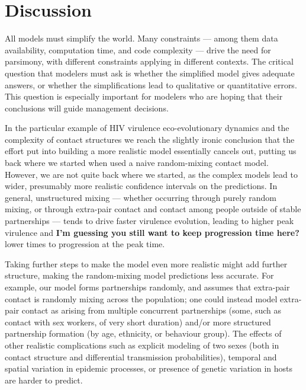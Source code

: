 \documentclass[10pt,letterpaper]{article}
\newcommand{\etal}{\textit{et al.}}
\newcommand{\todo}[1]{\color{red} \textbf{#1}}
\begin{document}
\section*{Discussion}

All models must simplify the world.  Many constraints --- among them data
availability, computation time, and code complexity --- drive the need
for parsimony, with different constraints applying in different
contexts. The critical question that modelers must ask is whether the
simplified model gives adequate answers, or whether the
simplifications lead to qualitative or quantitative errors.
This question is especially important for modelers who
are hoping that their conclusions will guide management decisions.

In the particular example of HIV virulence eco-evolutionary dynamics
and the complexity of contact structures
we reach the slightly ironic conclusion that the
effort put into building a more realistic model essentially cancels
out, putting us back where we started when used a naive random-mixing
contact model.
However, we are not quite back where we started, as the
complex models lead to wider, presumably more realistic
confidence intervals on the predictions.
In general, unstructured mixing --- whether occurring through 
purely random mixing, or through extra-pair contact and contact
among people outside of stable partnerships --- tends to drive
faster virulence evolution, leading to higher peak virulence and \todo{I'm guessing you still want to keep progression time here?}
lower times to progression at the peak time.

Taking further steps to make the model even more realistic
might add further structure,
making the random-mixing model predictions less accurate. For
example, our model forms partnerships randomly, and assumes that
extra-pair contact is randomly mixing across the population;
one could instead model extra-pair contact as arising from
multiple concurrent partnerships (some, such as contact with sex
workers, of very short duration) and/or more structured partnership
formation (by age, ethnicity, or behaviour group). The effects of
other realistic complications such as explicit modeling of two
sexes (both in contact structure and differential transmission
probabilities), temporal and spatial variation in epidemic processes,
or presence of genetic variation in hosts are harder to predict.
\end{document}
